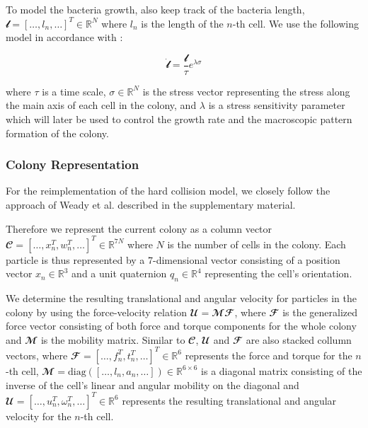 \documentclass[conference]{IEEEtran}
\begin{document}

To model the bacteria growth, also keep track of the bacteria length, $\mathbfcal{l} = [\dots, l_n, \dots]^T \in \mathbb{R}^{N}$ where $l_n$ is the length of the $n$-th cell. We use the following model in accordance with \cite{Weady2024}:

$$
    \dot{\mathbfcal{l}} =  \frac{\mathbfcal{l}}{\tau} e^{\lambda \mathbfcal{\sigma}}
$$

where $\tau$ is a time scale, $\mathbfcal{\sigma} \in \mathbb{R}^{N}$ is the stress vector representing the stress along the main axis of each cell in the colony, and $\lambda$ is a stress sensitivity parameter which will later be used to control the growth rate and the macroscopic pattern formation of the colony.


\subsubsection{Colony Representation}

For the reimplementation of the hard collision model, we closely follow the approach of Weady et al. \cite{Weady2024} described in the supplementary material.

Therefore we represent the current colony as a column vector $\mathbfcal{C} = [\dots, x_n^T, w_n^T, \dots]^T \in \mathbb{R}^{7N}$ where $N$ is the number of cells in the colony. Each particle is thus represented by a 7-dimensional vector consisting of a position vector $x_n \in \mathbb{R}^3$ and a unit quaternion $q_n \in \mathbb{R}^4$ representing the cell's orientation.

We determine the resulting translational and angular velocity for particles in the colony by using the force-velocity relation $\mathbfcal{U} = \mathbfcal{M} \mathbfcal{F}$, where $\mathbfcal{F}$ is the generalized force vector consisting of both force and torque components for the whole colony and $\mathbfcal{M}$ is the mobility matrix. Similar to $\mathbfcal{C}$, $\mathbfcal{U}$ and $\mathbfcal{F}$ are also stacked collumn vectors, where $\mathbfcal{F} = [\dots, f_n^T, t_n^T, \dots]^T \in \mathbb{R}^{6}$ represents the force and torque for the $n$-th cell, $\mathbfcal{M} = \text{diag}([\dots, l_n, a_n, \dots]) \in \mathbb{R}^{6 \times 6}$ is a diagonal matrix consisting of the inverse of the cell's linear and angular mobility on the diagonal and $\mathbfcal{U} = [\dots, u_n^T, \omega_n^T, \dots]^T \in \mathbb{R}^{6}$ represents the resulting translational and angular velocity for the $n$-th cell.
\end{document}
